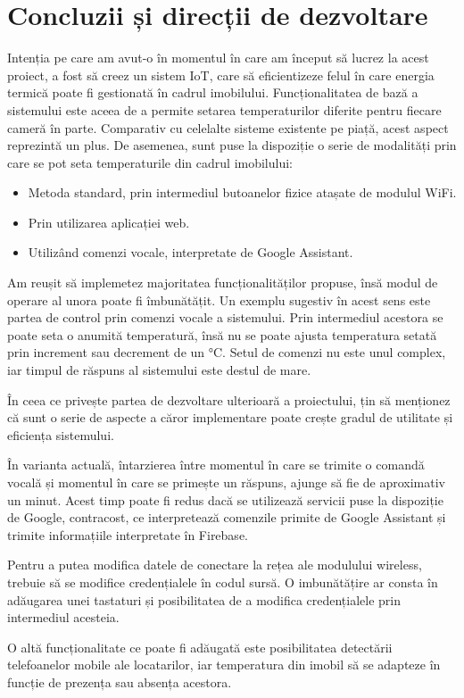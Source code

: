 \chapter{Concluzii și direcții de dezvoltare}\label{ch:5concluzii}

	Intenția pe care am avut-o în momentul în care am început să lucrez la acest proiect, a fost să creez un sistem IoT, care să eficientizeze felul în care energia termică poate fi gestionată în cadrul imobilului. Funcționalitatea de bază a sistemului este aceea de a permite setarea temperaturilor diferite pentru fiecare cameră în parte. Comparativ cu celelalte sisteme existente pe piață, acest aspect reprezintă un plus. De asemenea, sunt puse la dispoziție o serie de modalități prin care se pot seta temperaturile din cadrul imobilului:
	\begin{itemize}
  	\setlength{\itemindent}{2em}
		\itemsep0em
		\item Metoda standard, prin intermediul butoanelor fizice atașate de modulul WiFi.
		\item Prin utilizarea aplicației web.
		\item Utilizând comenzi vocale, interpretate de Google Assistant. 
	\end{itemize} 

\vspace{1em}
	Am reușit să implemetez majoritatea funcționalităților propuse, însă modul de operare al unora poate fi îmbunătățit. Un exemplu sugestiv în acest sens este partea de control prin comenzi vocale a sistemului. Prin intermediul acestora se poate seta o anumită temperatură, însă nu se poate ajusta temperatura setată prin increment sau decrement de un °C. Setul de comenzi nu este unul complex, iar timpul de răspuns al sistemului este destul de mare. 

\vspace{1em}
	În ceea ce privește partea de dezvoltare ulterioară a proiectului, țin să menționez că sunt o serie de aspecte a căror implementare poate crește gradul de utilitate și eficiența sistemului.

	În varianta actuală, întarzierea între momentul în care se trimite o comandă vocală și momentul în care se primește un răspuns, ajunge să fie de aproximativ un minut. Acest timp poate fi redus dacă se utilizează servicii puse la dispoziție de Google, contracost, ce interpretează comenzile primite de Google Assistant și trimite informațiile interpretate în Firebase. 

	Pentru a putea modifica datele de conectare la rețea ale modulului wireless, trebuie să se modifice credențialele în codul sursă. O imbunătățire ar consta în adăugarea unei tastaturi și posibilitatea de a modifica credențialele prin intermediul acesteia. 

	O altă funcționalitate ce poate fi adăugată este posibilitatea detectării telefoanelor mobile ale locatarilor, iar temperatura din imobil să se adapteze în funcție de prezența sau absența acestora.
	  